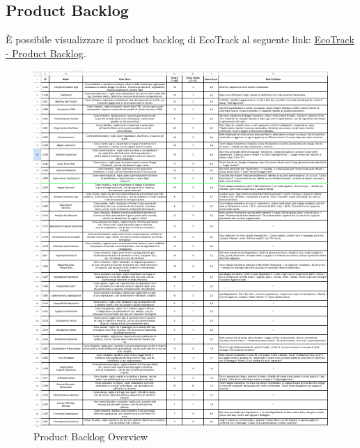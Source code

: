 \subsection{Product Backlog}
È possibile visualizzare il product backlog di EcoTrack al seguente link: \href{https://docs.google.com/spreadsheets/d/124BGyj-mUSipfd_NPPftBozjqdOnjI-apbYR-fjCgLY/edit?usp=sharing}{EcoTrack - Product Backlog}.
\begin{figure}[H]
    \centering
    \includegraphics[width=1\linewidth]{D3-G1//Img/Screenshot Product Backlog.png}
    \caption{Product Backlog Overview}
    \label{fig:enter-label}
\end{figure}

